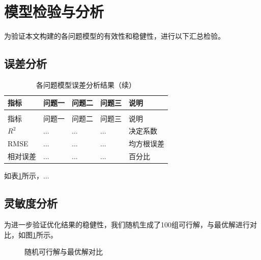 
\section{模型检验与分析}


为验证本文构建的各问题模型的有效性和稳健性，进行以下汇总检验。

\subsection{误差分析}

\begin{longtable}{>{\centering\arraybackslash}p{}>{\centering\arraybackslash}p{}>{\centering\arraybackslash}p{}>{\centering\arraybackslash}p{}>{\centering\arraybackslash}p{}}
  \caption{各问题模型误差分析结果}
  \label{tab:error} \\
  \toprule
  指标 & 问题一 & 问题二 & 问题三 & 说明 \\
  \midrule
  \endfirsthead
  \caption{各问题模型误差分析结果（续）} \\
  \toprule
  指标 & 问题一 & 问题二 & 问题三 & 说明 \\
  \midrule
  \endhead
  \bottomrule
  \endfoot
  $R^2$ & ... & ... & ... & 决定系数 \\
  RMSE & ... & ... & ... & 均方根误差 \\
  相对误差 & ... & ... & ... & 百分比 \\
\end{longtable}

如表\ref{tab:error}所示，...

\subsection{灵敏度分析}

为进一步验证优化结果的稳健性，我们随机生成了100组可行解，与最优解进行对比，如图\ref{fig:sensitivity}所示。

\begin{figure}[H]
  \centering
  \caption{随机可行解与最优解对比}
  \label{fig:sensitivity}
\end{figure}

